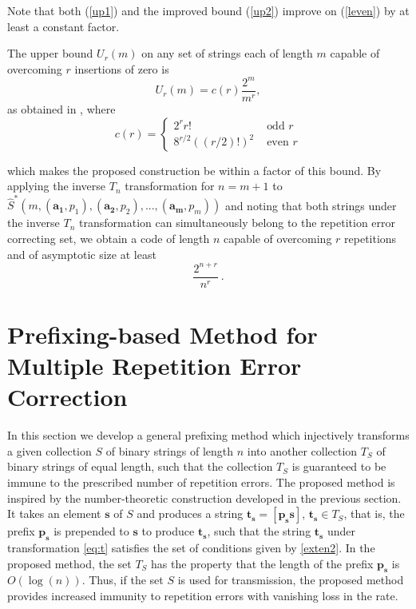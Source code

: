 \documentclass[12pt]{article} \pagestyle{plain} \topmargin
\begin{document}
Note that both (\ref{up1}) and the improved bound (\ref{up2})
improve on (\ref{leven}) by at least a constant factor.

The upper bound $U_r(m)$ on any set of strings each of length $m$
capable of overcoming $r$ insertions of zero is \[U_r(m)=c(r)
\frac{2^m}{m^r},\] as obtained in \cite{lev:66a}, where \[ c(r)
=\left\{
\begin{array}{lll} 2^r r! &
\text{ odd } r\\
8^{r/2}((r/2)!)^2&\text{ even } r\end{array} \right. \]

which makes the proposed construction be within a factor of this
bound. By applying the inverse $T_n$ transformation for $n=m+1$ to
$\hat{S}^*\left(m,(\mathbf{a_1},p_1),(\mathbf{a_2},p_2),...,(\mathbf{a_m},p_m)\right)$
and noting that both strings under the inverse $T_n$ transformation
can simultaneously belong to the repetition error correcting set, we
obtain a code of length $n$ capable of overcoming $r$ repetitions
and of asymptotic size at least
\begin{equation}\frac{2^{n+r}}{n^r}~.\end{equation}





\section{Prefixing-based Method for Multiple Repetition Error
Correction}\label{prefixing}

 In this section we develop a general prefixing method which injectively
transforms a given collection $S$ of binary strings of length $n$
into another collection $T_S$ of binary strings of equal length,
such that the collection $T_S$ is guaranteed to be immune to the
prescribed number of repetition errors. The proposed method is
inspired by the number-theoretic construction developed in the
previous section. It takes an element $\mathbf{s}$ of $S$ and
produces a string $\mathbf{t_s} =[\mathbf{p_s} {}\mathbf{s}]$,
$\mathbf{t_s} \in T_S$, that is, the prefix $\mathbf{p_s}$ is
prepended to $\mathbf{s}$ to produce $\mathbf{t_s}$, such that the
string $\mathbf{t_s}$ under transformation \eqref{eq:t} satisfies
the set of conditions given by \eqref{exten2}. In the proposed
method, the set $T_S$ has the property that the length of the prefix
$\mathbf{p_s}$ is $O(\log(n))$. Thus, if the set $S$ is used for
transmission, the proposed method provides increased immunity to
repetition errors with vanishing loss in the rate.
\end{document}
